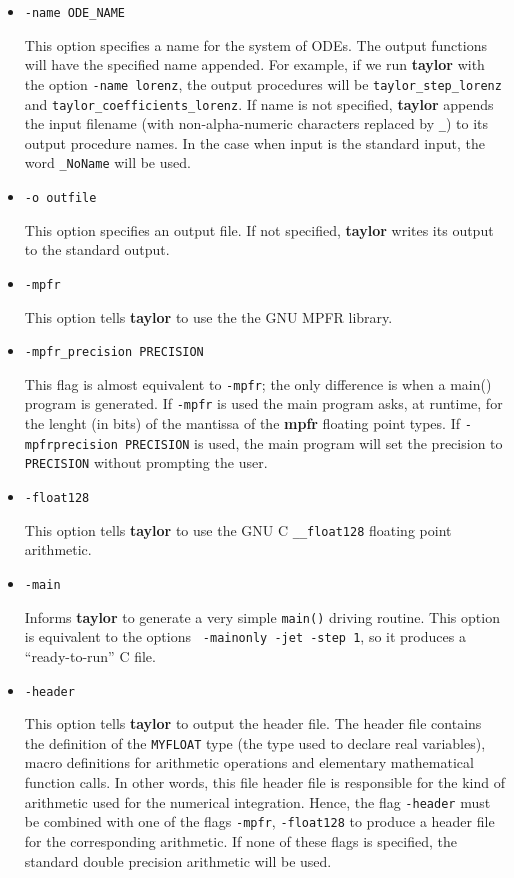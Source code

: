 \documentclass[10pt]{article}
\theoremstyle{remark}
\newcommand{\taylorname}{{\bf taylor}}
\newcommand{\myfloat}{{\tt MY\symbol{95}FLOAT}}
\begin{document}
\begin{itemize}
\item{ \verb+-name ODE_NAME+ 

This option specifies a name for the system of ODEs. The output
functions will have the specified name appended. For example, if we
run \taylorname{} with the option \verb+-name lorenz+, the output
procedures will be \verb+taylor_step_lorenz+ and
\verb+taylor_coefficients_lorenz+.  If name is not specified,
\taylorname{} appends the input filename (with non-alpha-numeric
characters replaced by \verb+_+) to its output procedure names. In the
case when input is the standard input, the word \verb+_NoName+ will be
used.}
\item{ \verb+-o outfile+ 

This option specifies an output file. If not specified, \taylorname{}
writes its output to the standard output.}

\noindent

\item{\verb+-mpfr+ 

This option tells \taylorname{} to use the the GNU MPFR library.  }

\item{\verb+-mpfr_precision PRECISION+

This flag is almost equivalent to {\tt -mpfr}; the only difference is
when a main() program is generated. If {\tt -mpfr} is used the main
program asks, at runtime, for the lenght (in bits) of the mantissa of
the {\bf mpfr} floating point types. If {\tt -mpfrprecision
  PRECISION} is used, the main program will set the precision to {\tt
  PRECISION} without prompting the user.}

\item{\verb+-float128+

This option tells \taylorname{} to use the GNU C \verb+__float128+
floating point arithmetic.  }

\item{\verb+-main+

Informs \taylorname{} to generate a very simple \verb+main()+ driving
routine. This option is equivalent to the options {\tt
  -mainonly -jet -step 1}, so it produces a
``ready-to-run'' C file.  }

\item{\verb+-header+ 

This option tells \taylorname{} to output the header file. The header
file contains the definition of the \myfloat{} type (the type used to
declare real variables), macro definitions for arithmetic operations
and elementary mathematical function calls. In other words, this file
header file is responsible for the kind of arithmetic used for the
numerical integration.  Hence, the flag {\tt -header} must be combined
with one of the flags {\tt -mpfr}, {\tt -float128} to produce a header
file for the corresponding arithmetic. If none of these flags is
specified, the standard double precision arithmetic will be used.

}
\end{itemize}
\end{document}
